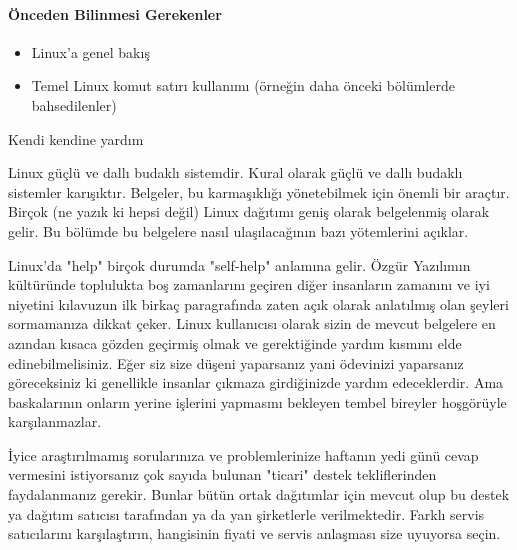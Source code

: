\documentclass[10pt,a5paper]{book}
\begin{document}
\paragraph{Önceden Bilinmesi Gerekenler}
\begin{itemize}
 \item Linux'a genel bakış
 \item Temel Linux komut satırı kullanımı (örneğin daha önceki bölümlerde bahsedilenler)
\end{itemize}
\begin{section}{Kendi kendine yardım}

Linux güçlü ve dallı budaklı sistemdir. Kural olarak güçlü ve dallı budaklı sistemler karışıktır. Belgeler, bu karmaşıklığı yönetebilmek için önemli bir araçtır. Birçok (ne yazık ki hepsi değil) Linux dağıtımı geniş olarak belgelenmiş olarak gelir. Bu bölümde bu belgelere nasıl ulaşılacağının bazı yötemlerini açıklar.

Linux'da "help" birçok durumda "self-help" anlamına gelir. Özgür Yazılımın kültüründe toplulukta boş zamanlarını geçiren diğer insanların  
zamanını ve iyi niyetini kılavuzun ilk birkaç paragrafında zaten açık olarak anlatılmış olan şeyleri sormamanıza dikkat çeker. Linux kullanıcısı
olarak sizin de mevcut belgelere en azından kısaca gözden geçirmiş olmak ve gerektiğinde yardım kısmını elde edinebilmelisiniz. Eğer siz size düşeni
yaparsanız yani ödevinizi yaparsanız göreceksiniz ki genellikle insanlar çıkmaza girdiğinizde yardım edeceklerdir. Ama baskalarının onların yerine
işlerini yapmasını bekleyen tembel bireyler hoşgörüyle karşılanmazlar.

İyice araştırılmamış sorularınıza ve problemlerinize haftanın yedi günü cevap vermesini istiyorsanız çok sayıda bulunan "ticari" destek tekliflerinden faydalanmanız gerekir. Bunlar bütün ortak dağıtımlar için mevcut olup bu destek ya dağıtım satıcısı tarafından ya da yan şirketlerle verilmektedir. Farklı servis satıcılarını karşılaştırın, hangisinin fiyati ve servis anlaşması size uyuyorsa seçin.
\end{section}
\end{document}
